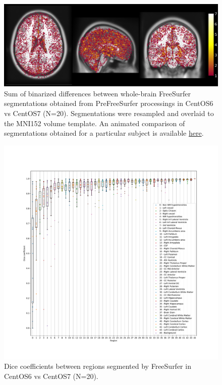 \documentclass[a4paper,num-refs]{oup-contemporary}
\begin{document}
\begin{figure}
\centering
  \includegraphics[width=\columnwidth]{images/brain_segmentation_mni.png} 
  \caption{Sum of binarized differences between whole-brain FreeSurfer
  segmentations obtained from PreFreeSurfer processings in CentOS6 vs CentOS7
   (N=20). Segmentations were resampled and overlaid to the MNI152 volume
  template. An animated comparison of segmentations obtained for a particular subject is available
\href{https://github.com/big-data-lab-team/HCP-reproducibility-paper/blob/master/images/fs_brain_segmentation.gif}
{here}.
} 
  \label{fig:tissue_class}
\end{figure}

\begin{figure}
  \hspace*{-1cm}
  \includegraphics[width=1.2\linewidth]{images/dice_regions.pdf}
    \caption{Dice coefficients between regions segmented by FreeSurfer in CentOS6 vs CentOS7 (N=20).}
    \label{fig:scatter_plot}
  \end{figure}
\end{document}
